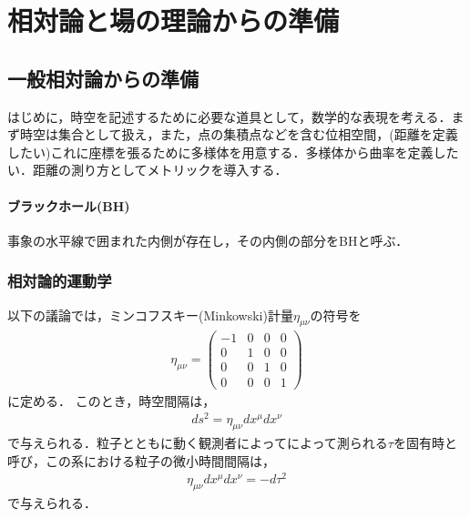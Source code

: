 \chapter{相対論と場の理論からの準備}
\section{一般相対論からの準備}
はじめに，時空を記述するために必要な道具として，数学的な表現を考える．まず時空は集合として扱え，また，点の集積点などを含む位相空間，(距離を定義したい)これに座標を張るために多様体を用意する．多様体から曲率を定義したい．距離の測り方としてメトリックを導入する．
\subsubsection{ブラックホール(BH)}
事象の水平線で囲まれた内側が存在し，その内側の部分をBHと呼ぶ．
\subsection{相対論的運動学}
以下の議論では，ミンコフスキー(Minkowski)計量$\eta_{\mu\nu}$の符号を
\begin{eqnarray}
\label{D1}
\eta_{\mu\nu}=
\left(\begin{array}{cccc}-1 & 0 & 0 & 0 \\
0 & 1 & 0 & 0 \\
0 & 0 & 1 & 0 \\
0 & 0 & 0 & 1
\end{array}\right)
\end{eqnarray}
に定める．
このとき，時空間隔は，
\begin{eqnarray}
ds^2=\eta_{\mu\nu}dx^{\mu}dx^{\nu}
\end{eqnarray}
で与えられる．粒子とともに動く観測者によってによって測られる$\tau$を固有時と呼び，この系における粒子の微小時間間隔は，
\begin{eqnarray}
\label{tau}
\eta_{\mu\nu}dx^{\mu}dx^{\nu}=-d\tau^2
\end{eqnarray}
で与えられる．

